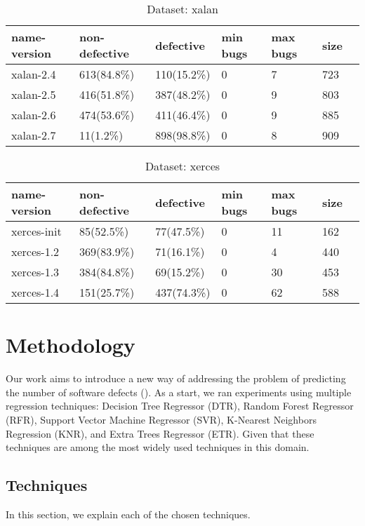 \documentclass[]{article}
\begin{document}
	\begin{table}[h]
		\caption{Dataset: xalan}\label{tab:xalan}
		\begin{tabular}{lllllll}
			\hline
			name-version & non-defective & defective & min bugs & max bugs & size \\ \hline
			xalan-2.4 & 613(84.8\%) & 110(15.2\%) & 0 & 7 & 723 \\ 
			xalan-2.5 & 416(51.8\%) & 387(48.2\%) & 0 & 9 & 803 \\ 
			xalan-2.6 & 474(53.6\%) & 411(46.4\%) & 0 & 9 & 885 \\ 
			xalan-2.7 & 11(1.2\%) & 898(98.8\%) & 0 & 8 & 909 \\ \hline
		\end{tabular}
	\end{table}
	\begin{table}[h]
		\caption{Dataset: xerces}\label{tab:xerces}
		\begin{tabular}{lllllll}
			\hline
			name-version & non-defective & defective & min bugs & max bugs & size \\ \hline
			xerces-init & 85(52.5\%) & 77(47.5\%) & 0 & 11 & 162 \\ 
			xerces-1.2 & 369(83.9\%) & 71(16.1\%) & 0 & 4 & 440 \\ 
			xerces-1.3 & 384(84.8\%) & 69(15.2\%) & 0 & 30 & 453 \\ 
			xerces-1.4 & 151(25.7\%) & 437(74.3\%) & 0 & 62 & 588 \\ \hline
		\end{tabular}
	\end{table}
\FloatBarrier
	\section{Methodology}
	
	Our work aims to introduce a new way of addressing the problem of predicting the number of software defects ().
	As a start, we ran experiments using multiple regression techniques: Decision Tree Regressor (DTR), Random Forest Regressor (RFR), Support Vector Machine Regressor (SVR), K-Nearest Neighbors Regression (KNR), and Extra Trees Regressor (ETR). Given that these techniques are among the most widely used techniques in this domain.
	\subsection{Techniques}
	In this section, we explain each of the chosen techniques.\\
	
\end{document}
